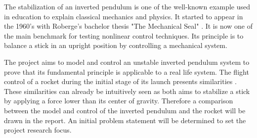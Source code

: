 %
%
%
%
%

The stabilization of an inverted pendulum is one of the well-known example used in education to explain classical mechanics and physics. It started to appear in the 1960's with Roberge's bachelor thesis "The Mechanical Seal" \citep{sci_article:InvertedPendulumHistory}. It is now one of the main benchmark for testing nonlinear control techniques. Its principle is to balance a stick in an upright position by controlling a mechanical system.

The project aims to model and control an unstable inverted pendulum system to prove that its fundamental principle is applicable to a real life system. The flight control of a rocket during the initial stage of its launch presents similarities \citep{sci_article:InvertedPendulumHistory}. These similarities can already be intuitively seen as both aims to stabilize a stick by applying a force lower than its center of gravity. Therefore a comparison between the model and control of the inverted pendulum and the rocket will be drawn in the report. An initial problem statement will be determined to set the project research focus.  